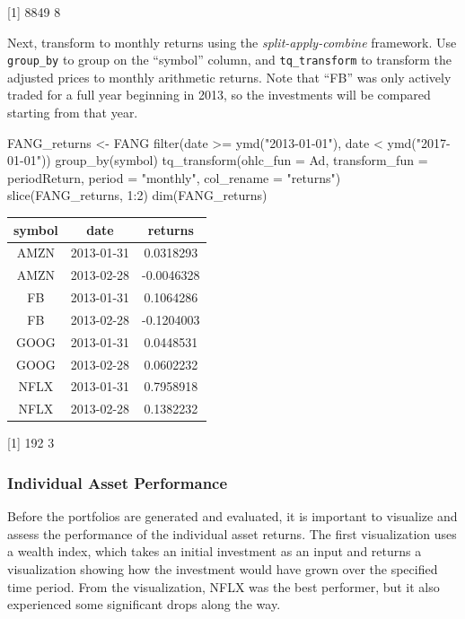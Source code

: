 {[}1{]} 8849 8

\hspace{20 mm}

Next, transform to monthly returns using the \emph{split-apply-combine}
framework. Use \texttt{group\_by} to group on the ``symbol'' column, and
\texttt{tq\_transform} to transform the adjusted prices to monthly
arithmetic returns. Note that ``FB'' was only actively traded for a full
year beginning in 2013, so the investments will be compared starting
from that year.

\begin{Schunk}
\begin{Sinput}
FANG_returns <- FANG %
    filter(date >= ymd("2013-01-01"),
           date <  ymd("2017-01-01")) %
    group_by(symbol) %
    tq_transform(ohlc_fun = Ad,
                 transform_fun = periodReturn,
                 period = "monthly",
                 col_rename = "returns")
slice(FANG_returns, 1:2)
dim(FANG_returns)
\end{Sinput}
\end{Schunk}

\begin{tabular}{ccc}
\toprule
symbol & date & returns\\
\midrule
AMZN & 2013-01-31 & 0.0318293\\
AMZN & 2013-02-28 & -0.0046328\\
FB & 2013-01-31 & 0.1064286\\
FB & 2013-02-28 & -0.1204003\\
GOOG & 2013-01-31 & 0.0448531\\
\addlinespace
GOOG & 2013-02-28 & 0.0602232\\
NFLX & 2013-01-31 & 0.7958918\\
NFLX & 2013-02-28 & 0.1382232\\
\bottomrule
\end{tabular}

{[}1{]} 192 3

\hspace{20 mm}

\subsubsection{Individual Asset
Performance}\label{individual-asset-performance}

Before the portfolios are generated and evaluated, it is important to
visualize and assess the performance of the individual asset returns.
The first visualization uses a wealth index, which takes an initial
investment as an input and returns a visualization showing how the
investment would have grown over the specified time period. From the
visualization, NFLX was the best performer, but it also experienced some
significant drops along the way.

